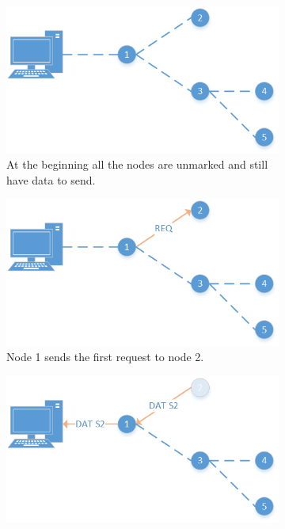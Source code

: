 \begin{figure}[htbp]
	\centering
	\begin{subfigure}[t]{0.4\textwidth}
		\centering
    		\includegraphics[scale=0.6]{content/images/Collection/Part0}
   	 	\caption{At the beginning all the nodes are unmarked and still have data to send.}
    	\label{fig:coll0}
    \end{subfigure}
    \quad
    \quad	
	\begin{subfigure}[t]{0.4\textwidth}
		\centering
    		\includegraphics[scale=0.6]{content/images/Collection/Part1}
   	 	\caption{Node 1 sends the first request to node 2.}
    	\label{fig:coll1}
    \end{subfigure}
    \quad
    \quad
    \begin{subfigure}[t]{0.4\textwidth}
		\centering         
        \includegraphics[scale=0.6]{content/images/Collection/Part2}

\end{subfigure}
\end{figure}
